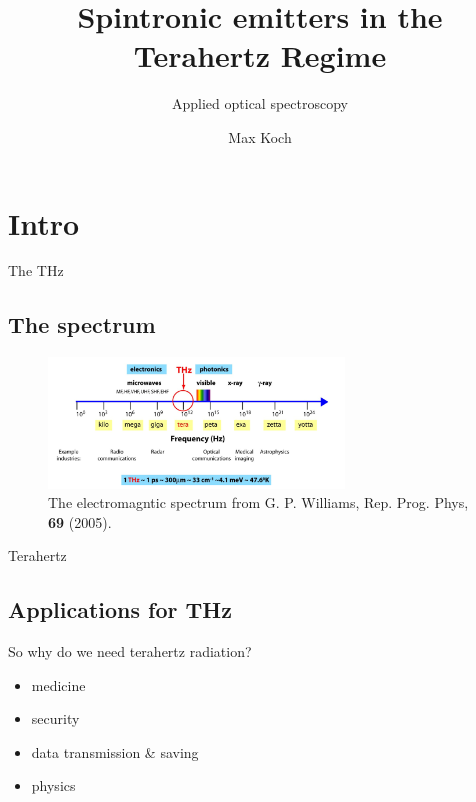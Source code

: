 \documentclass[aspectratio=1610, 9pt]{beamer}
\title{Spintronic emitters in the Terahertz Regime}
\subtitle{Applied optical spectroscopy}
\author[M.~Koch]{Max Koch}
\institute[]{TU Dortmund \\  Fakultät Physik}
\begin{document}
\maketitle

\section{Intro}

\begin{frame}{The THz}
  \subsection{The spectrum}
  \begin{center}
    \begin{figure}
      \includegraphics[width=0.7\textwidth]{images/spectrum.png}
      \caption{\textcolor{tugreen}{The electromagntic spectrum} from G. P. Williams, Rep. Prog. Phys, \textbf{69} (2005)\nocite{spectrum_pic}.}
    \end{figure}
  \end{center}
\end{frame}


\begin{frame}{Terahertz}
  \subsection{Applications for THz}
  \begin{center}
    \begin{minipage}[c]{0.5\linewidth}
      So why do we need terahertz radiation?
      \vspace{0.2in}
      \begin{itemize}
        \item medicine \nocite{THzgap_applications}
        \vspace{0.1in}
        \item security \nocite{thz_explosive_detec}
        \vspace{0.1in}
        \item data transmission \& saving \nocite{communication,datasaving}
        \vspace{0.1in}
        \item physics \nocite{wiki_book}
      \end{itemize}
    \end{minipage}
\end{center}
\end{frame}
\end{document}
